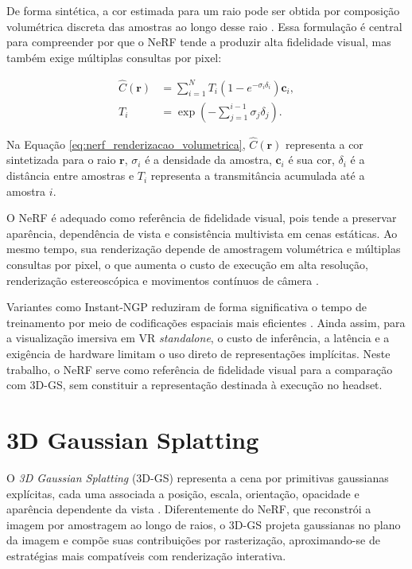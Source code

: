 De forma sintética, a cor estimada para um raio pode ser obtida por composição volumétrica discreta das amostras ao longo desse raio \cite{mildenhall2020}. Essa formulação é central para compreender por que o NeRF tende a produzir alta fidelidade visual, mas também exige múltiplas consultas por pixel:

\begin{equation}
\begin{aligned}
\hat{C}(\mathbf{r}) &=
\sum_{i=1}^{N} T_i \left(1 - e^{-\sigma_i \delta_i}\right)\mathbf{c}_i,\\
T_i &= \exp\left(-\sum_{j=1}^{i-1}\sigma_j \delta_j\right).
\end{aligned}
\label{eq:nerf_renderizacao_volumetrica}
\end{equation}

Na Equação \ref{eq:nerf_renderizacao_volumetrica}, $\hat{C}(\mathbf{r})$ representa a cor sintetizada para o raio $\mathbf{r}$, $\sigma_i$ é a densidade da amostra, $\mathbf{c}_i$ é sua cor, $\delta_i$ é a distância entre amostras e $T_i$ representa a transmitância acumulada até a amostra $i$.

O NeRF é adequado como referência de fidelidade visual, pois tende a preservar aparência, dependência de vista e consistência multivista em cenas estáticas. Ao mesmo tempo, sua renderização depende de amostragem volumétrica e múltiplas consultas por pixel, o que aumenta o custo de execução em alta resolução, renderização estereoscópica e movimentos contínuos de câmera \cite{mildenhall2020,xu2023}.

Variantes como Instant-NGP reduziram de forma significativa o tempo de treinamento por meio de codificações espaciais mais eficientes \cite{muller2022}. Ainda assim, para a visualização imersiva em VR \textit{standalone}, o custo de inferência, a latência e a exigência de hardware limitam o uso direto de representações implícitas. Neste trabalho, o NeRF serve como referência de fidelidade visual para a comparação com 3D-GS, sem constituir a representação destinada à execução no headset.

\section{3D Gaussian Splatting}

O \textit{3D Gaussian Splatting} (3D-GS) representa a cena por primitivas gaussianas explícitas, cada uma associada a posição, escala, orientação, opacidade e aparência dependente da vista \cite{kerbl2023,fei2025survey3dgs,chen2024survey3dgs}. Diferentemente do NeRF, que reconstrói a imagem por amostragem ao longo de raios, o 3D-GS projeta gaussianas no plano da imagem e compõe suas contribuições por rasterização, aproximando-se de estratégias mais compatíveis com renderização interativa.

